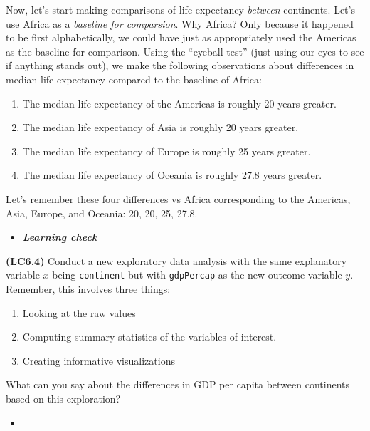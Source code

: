 \documentclass[12pt,]{krantz}
\providecommand{\tightlist}{%
  \setlength{\itemsep}{0pt}\setlength{\parskip}{0pt}}
\newenvironment{rmdblock}[1]
  {\begin{shaded*}
  \begin{itemize}
  \renewcommand{\labelitemi}{
    \raisebox{-.7\height}[0pt][0pt]{
    }
  }
  \item
  }
  {
  \end{itemize}
  \end{shaded*}
  }
\newenvironment{learncheck}
  {\begin{rmdblock}{warning}}
  {\end{rmdblock}}
\begin{document}
Now, let's start making comparisons of life expectancy \emph{between}
continents. Let's use Africa as a \emph{baseline for comparsion}. Why
Africa? Only because it happened to be first alphabetically, we could
have just as appropriately used the Americas as the baseline for
comparison. Using the ``eyeball test'' (just using our eyes to see if
anything stands out), we make the following observations about
differences in median life expectancy compared to the baseline of
Africa:

\begin{enumerate}
\def\labelenumi{\arabic{enumi}.}
\tightlist
\item
  The median life expectancy of the Americas is roughly 20 years
  greater.
\item
  The median life expectancy of Asia is roughly 20 years greater.
\item
  The median life expectancy of Europe is roughly 25 years greater.
\item
  The median life expectancy of Oceania is roughly 27.8 years greater.
\end{enumerate}

Let's remember these four differences vs Africa corresponding to the
Americas, Asia, Europe, and Oceania: 20, 20, 25, 27.8.

\begin{learncheck}
\textbf{\emph{Learning check}}
\end{learncheck}

\textbf{(LC6.4)} Conduct a new exploratory data analysis with the same
explanatory variable \(x\) being \texttt{continent} but with
\texttt{gdpPercap} as the new outcome variable \(y\). Remember, this
involves three things:

\begin{enumerate}
\def\labelenumi{\alph{enumi})}
\tightlist
\item
  Looking at the raw values
\item
  Computing summary statistics of the variables of interest.
\item
  Creating informative visualizations
\end{enumerate}

What can you say about the differences in GDP per capita between
continents based on this exploration?

\begin{learncheck}

\end{learncheck}
\end{document}
